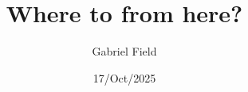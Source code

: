 \documentclass{beamer}
\title{Where to from here?}
\author{Gabriel Field}
\date{17/Oct/2025}
\begin{document}
\frame{\titlepage}


\end{document}
